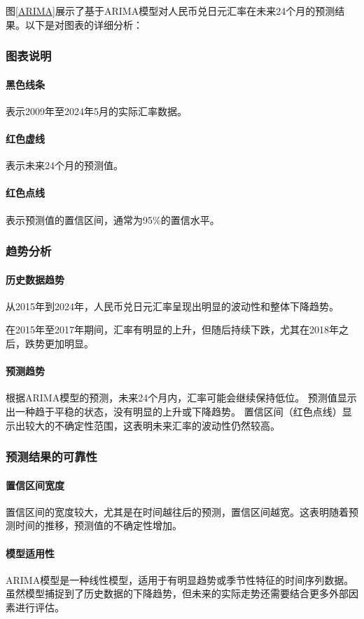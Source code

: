 图\ref{ARIMA}展示了基于ARIMA模型对人民币兑日元汇率在未来24个月的预测结果。以下是对图表的详细分析：

\subsubsection{图表说明}
\paragraph{黑色线条}表示2009年至2024年5月的实际汇率数据。
\paragraph{红色虚线}表示未来24个月的预测值。
\paragraph{红色点线}表示预测值的置信区间，通常为95\%的置信水平。

\subsubsection{趋势分析}
\paragraph{历史数据趋势}
从2015年到2024年，人民币兑日元汇率呈现出明显的波动性和整体下降趋势。

在2015年至2017年期间，汇率有明显的上升，但随后持续下跌，尤其在2018年之后，跌势更加明显。
 
\paragraph{预测趋势}
根据ARIMA模型的预测，未来24个月内，汇率可能会继续保持低位。
预测值显示出一种趋于平稳的状态，没有明显的上升或下降趋势。
置信区间（红色点线）显示出较大的不确定性范围，这表明未来汇率的波动性仍然较高。

\subsubsection{预测结果的可靠性}
\paragraph{置信区间宽度}置信区间的宽度较大，尤其是在时间越往后的预测，置信区间越宽。这表明随着预测时间的推移，预测值的不确定性增加。
\paragraph{模型适用性}ARIMA模型是一种线性模型，适用于有明显趋势或季节性特征的时间序列数据。虽然模型捕捉到了历史数据的下降趋势，但未来的实际走势还需要结合更多外部因素进行评估。

